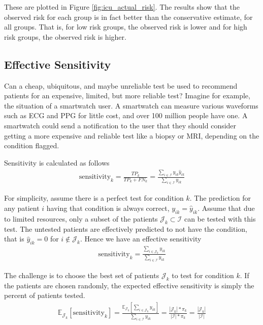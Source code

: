 These are plotted in Figure \ref{fig:icu_actual_risk}.  The results show that the observed risk for each group is in fact better than the conservative estimate, for all groups.  That is, for low risk groups, the observed risk is lower and for high risk groups, the observed risk is higher.

\figIcuCardio
\figIcuSystolic
\figIcuCerebral
\figIcuMyocard

\pagebreak
\subsection{Effective Sensitivity}

Can a cheap, ubiquitous, and maybe unreliable test be used to recommend patients for an expensive, limited, but more reliable test?  Imagine for example, the situation of a smartwatch user.  A smartwatch can measure various waveforms such as ECG and PPG for little cost, and over 100 million people have one.  A smartwatch could send a notification to the user that they should consider getting a more expensive and reliable test like a biopsy or MRI, depending on the condition flagged.

Sensitivity is calculated as follows
\begin{gather}
    \text{sensitivity}_k 
        = \frac{TP_k}{TP_k + FN_k}
        = \frac
            {\sum_{i \in \mathcal{I}} y_{ik} \hat{y}_{ik}}
            {\sum_{i \in \mathcal{I}} y_{ik}}
\end{gather}

For simplicity, assume there is a perfect test for condition $k$.  The prediction for any patient $i$ having that condition is always correct, $y_{ik} = \hat{y}_{ik}$.  Assume that due to limited resources, only a subset of the patients $\mathcal{J}_k \subset \mathcal{I}$ can be tested with this test. The untested patients are effectively predicted to not have the condition, that is $\hat{y}_{ik} = 0$ for $i \notin \mathcal{J}_k$.  Hence we have an effective sensitivity
\begin{gather}
    \text{sensitivity}_k = \frac
        {\sum_{i \in \mathcal{J}_k} y_{ik}}
        {\sum_{i \in \mathcal{I}} y_{ik}}
\end{gather}

The challenge is to choose the best set of patients $\mathcal{J}_k$ to test for condition $k$.  If the patients are chosen randomly, the expected effective sensitivity is simply the percent of patients tested.
\begin{gather}
    \mathbb{E}_{\mathcal{J}_k}[\text{sensitivity}_k]
        = \frac
            {\mathbb{E}_{\mathcal{J}_k}[\sum_{i \in \mathcal{J}_k} y_{ik}]}
            {\sum_{i \in \mathcal{I}} y_{ik}}
        = \frac{|\mathcal{J}_k| * \pi_k}{|\mathcal{I}| * \pi_k} 
        = \frac{|\mathcal{J}_k|}{|\mathcal{I}|} 
\end{gather}

